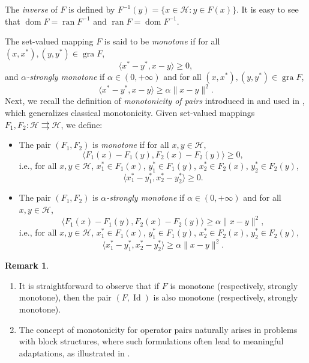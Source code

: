 \documentclass[11pt]{article}
\theoremstyle{definition}
\theoremstyle{definition}
\theoremstyle{definition}
\newtheorem{remark}[theorem]{Remark}
\newcommand{\ran}{\ensuremath{\operatorname{ran}}}
\newcommand{\dom}{\ensuremath{\operatorname{dom}}}
\newcommand{\gra}{\ensuremath{\operatorname{gra}}}
\newcommand{\Id}{\ensuremath{\operatorname{Id}}}
\def\beq{\begin{equation}}
\def\eeq{\end{equation}}
\def\beqq{\begin{equation*}}
\def\eeqq{\end{equation*}}
\begin{document}
The \emph{inverse} of \( F \) is defined by \( F^{-1}(y) = \{x \in \mathcal{H} : y \in F(x)\} \). It is easy to see that \( \dom F = \ran F^{-1} \) and \( \ran F = \dom F^{-1} \).  

The set-valued mapping \( F \) is said to be \emph{monotone} if for all \( (x, x^*), (y, y^*) \in \gra F \),
\[
\langle x^* - y^*, x - y \rangle \geq 0,
\]
and \emph{\(\alpha\)-strongly monotone} if \( \alpha \in (0, +\infty) \) and for all \( (x, x^*), (y, y^*) \in \gra F \),
\[
\langle x^* - y^*, x - y \rangle \geq \alpha \|x - y\|^2.
\]  
Next, we recall the definition of \emph{monotonicity of pairs} introduced in \cite{acl} and used in \cite{LDT}, which generalizes classical monotonicity. Given set-valued mappings \( F_1, F_2 : \mathcal{H} \rightrightarrows \mathcal{H} \), we define:  
\begin{itemize}
\item
The pair \( (F_1, F_2) \) is \emph{monotone} if for all \( x, y \in \mathcal{H} \),
\beqq
\langle F_1(x) - F_1(y), F_2(x) - F_2(y) \rangle \geq 0,
\eeqq 
i.e., for all \( x, y \in \mathcal{H} \), \( x_1^* \in F_1(x) \), \( y_1^* \in F_1(y) \), \( x_2^* \in F_2(x) \), \( y_2^* \in F_2(y) \),
$$
\langle x_1^* - y_1^*, x_2^* - y_2^* \rangle \geq 0.
$$
\item
The pair \( (F_1, F_2) \) is \emph{\(\alpha\)-strongly monotone} if \( \alpha \in (0, +\infty) \) and for all \( x, y \in \mathcal{H} \),
\beq\label{strong}
\langle F_1(x) - F_1(y), F_2(x) - F_2(y) \rangle \geq \alpha \|x - y\|^2,
\eeq
i.e., for all \( x, y \in \mathcal{H} \), \( x_1^* \in F_1(x) \), \( y_1^* \in F_1(y) \), \( x_2^* \in F_2(x) \), \( y_2^* \in F_2(y) \),
$$
\langle x_1^* - y_1^*, x_2^* - y_2^* \rangle \geq \alpha \|x - y\|^2.
$$
\end{itemize}  

\begin{remark}
	\begin{enumerate}
		\item It is straightforward to observe that if \( F \) is monotone (respectively, strongly monotone), then the pair 
		\( (F, \Id) \) is also monotone (respectively, strongly monotone).
		\item  The concept of monotonicity for operator pairs naturally arises in problems with block structures, where such formulations often lead to meaningful adaptations, as illustrated in \cite[Examples 2.1 and 2.2]{LDT}.
	\end{enumerate}	
\end{remark}
\end{document}
